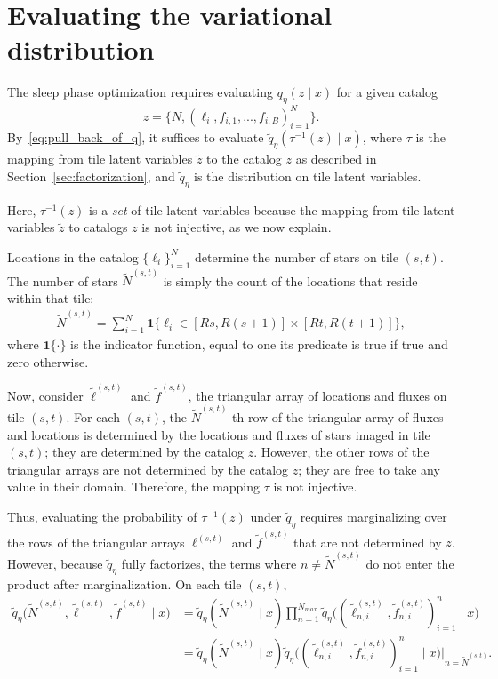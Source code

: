 \section{Evaluating the variational distribution}
\label{sec:eval_var_distr}

The sleep phase optimization requires evaluating
$q_\eta(z \mid x)$ for a given catalog
\[z = \{N, (\ell_i, f_{i,1}, ..., f_{i,B})_{i = 1}^N\}.\]
By~\eqref{eq:pull_back_of_q}, 
it suffices to evaluate $\tilde q_\eta(\tau^{-1}(z) \mid x)$, 
where $\tau$ is the mapping from tile latent variables $\tilde z$ to the catalog $z$ as described in Section~\ref{sec:factorization}, 
and $\tilde q_\eta$ is the distribution on tile latent variables. 

Here, $\tau^{-1}(z)$ is a {\itshape set} of tile latent variables because the mapping from tile latent variables $\tilde z$ to catalogs $z$ is not injective, as we now explain.  

Locations in the catalog $\{\ell_i\}_{i=1}^N$
determine the number of stars on tile $(s,t)$. 
The number of stars $\tilde N^{(s,t)}$ is simply the count of the locations that reside within that tile:
\begin{align}
\tilde N^{(s,t)} = \sum_{i=1}^N 
\mathbf 1 \Big\{\ell_i\in [Rs, R(s+1)] \times [Rt, R(t+1)]\Big\},
\end{align}
where $\mathbf{1}\{\cdot\}$ is the indicator function, equal to one its predicate is true if true and zero otherwise.

Now, consider $\tilde\ell^{(s, t)}$ and $\tilde f^{(s, t)}$, the triangular array of locations and fluxes on tile $(s,t)$. 
For each $(s,t)$, the $\tilde N^{(s,t)}$-th row 
of the triangular array of fluxes and locations is
determined by the locations and fluxes of stars imaged in tile $(s,t)$; they are determined by the catalog $z$. However, the other rows 
of the triangular arrays are not determined by 
the catalog $z$; they are free to take any value in their domain. Therefore, the mapping $\tau$ is not injective. 

Thus, evaluating the probability of $\tau^{-1}(z)$ under $\tilde q_\eta$ requires marginalizing over the rows of the triangular arrays $\ell^{(s, t)}$ and $\tilde f^{(s, t)}$ that are not determined by $z$. However, 
because $\tilde q_\eta$ fully factorizes, the terms 
where $n \not= \tilde N^{(s,t)}$ do not enter the
product
after marginalization.
On each tile $(s,t)$,
\begin{align}
    \tilde q_\eta\big(\tilde N^{(s, t)}, \tilde \ell^{(s, t)}, \tilde f^{(s, t)} \mid x\big) &= 
    \tilde q_\eta(\tilde N^{(s,t)} \mid x) 
    \prod_{n = 1}^{N_{max}}
    \tilde q_\eta\big((\tilde \ell_{n,i}^{(s, t)}, 
    \tilde f_{n,i}^{(s, t)})_{i=1}^n \mid x\big) \\
    &= \tilde q_\eta(\tilde N^{(s,t)} \mid x) 
    \tilde q_\eta\big((\tilde \ell_{n,i}^{(s, t)}, 
    \tilde f_{n,i}^{(s, t)})_{i=1}^n \mid x\big)\Bigg|_{n = \tilde N^{(s,t)}}.
\end{align}


